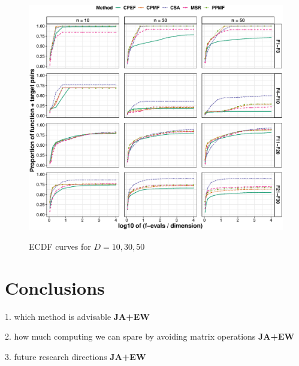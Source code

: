 \documentclass[runningheads,a4paper]{llncs}
\begin{document}
\begin{figure}[H]
  \centering
  \includegraphics[width=\textwidth]{problems-cec-17}
  \label{cec17-ecdf}
  \caption{ECDF curves for $D = 10, 30, 50$}
\end{figure}



\section{Conclusions}

1. which method is advisable
{\bf  JA+EW}

2. how much computing we can spare by avoiding matrix operations
{\bf  JA+EW}

3. future research directions
{\bf  JA+EW}




\end{document}
